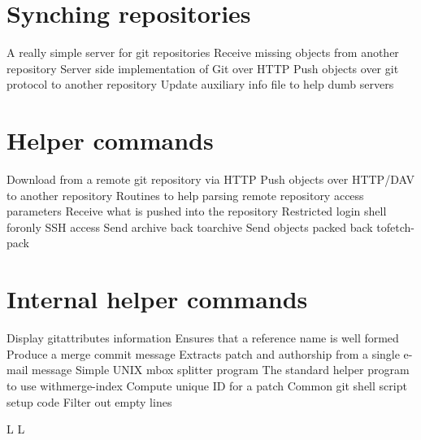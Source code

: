 \section{Synching repositories}
	{A really simple server for git repositories}
	{Receive missing objects from another repository}
	{Server side implementation of Git over HTTP}
	{Push objects over git protocol to another repository}
	{Update auxiliary info file to help dumb servers}

\section{Helper commands}
	{Download from a remote git repository via HTTP}
	{Push objects over HTTP/DAV to another repository}
	{Routines to help parsing remote repository access parameters}
	{Receive what is pushed into the repository}
	{Restricted login shell foronly SSH access}
	{Send archive back toarchive}
	{Send objects packed back tofetch-pack}

\section{Internal helper commands}
	{Display gitattributes information}
	{Ensures that a reference name is well formed}
	{Produce a merge commit message}
	{Extracts patch and authorship from a single e-mail message}
	{Simple UNIX mbox splitter program}
	{The standard helper program to use withmerge-index}
	{Compute unique ID for a patch}
	{Common git shell script setup code}
	{Filter out empty lines}


\copyrightnotice

\supereject
\if L\lr \else\null\vfill\eject\fi
\if L\lr \else\null\vfill\eject\fi
\bye

